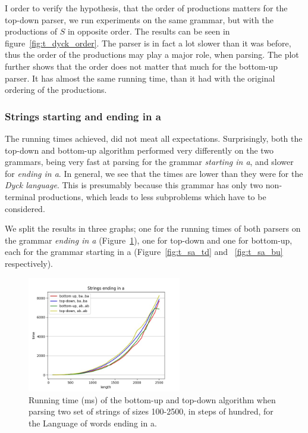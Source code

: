 I order to verify the hypothesis, that the order of productions matters for the top-down parser, we run experiments on the same grammar, but with the productions of $S$ in opposite order.
The results can be seen in figure~\ref{fig:t_dyck_order}.
The parser is in fact a lot slower than it was before, thus the order of the productions may play a major role, when parsing.
The plot further shows that the order does not matter that much for the bottom-up parser.
It has almost the same running time, than it had with the original ordering of the productions.

\subsubsection{Strings starting and ending in a}

The running times achieved, did not meat all expectations.
Surprisingly, both the top-down and bottom-up algorithm performed very differently on the two grammars, being very fast at parsing for the grammar \textit{starting in a}, and slower for \textit{ending in a}.
In general, we see that the times are lower than they were for the \textit{Dyck language}.
This is presumably because this grammar has only two non-terminal productions, which leads to less subproblems which have to be considered.

We split the results in three graphs; one for the running times of both parsers on the grammar \textit{ending in a} (Figure~\ref{fig:t_ea_td_bu}), one for top-down and one for bottom-up, each for the grammar starting in a (Figure~\ref{fig:t_sa_td} and ~\ref{fig:t_sa_bu} respectively).

\begin{figure}[h!]
    \centering
    \includegraphics[width=0.6\textwidth]{Resources/t_ea_td_bu.jpg}
    \caption{Running time (ms) of the bottom-up and top-down algorithm when parsing two set of strings of sizes 100-2500, in steps of hundred, for the Language of words ending in a.}
    \label{fig:t_ea_td_bu}
\end{figure}

